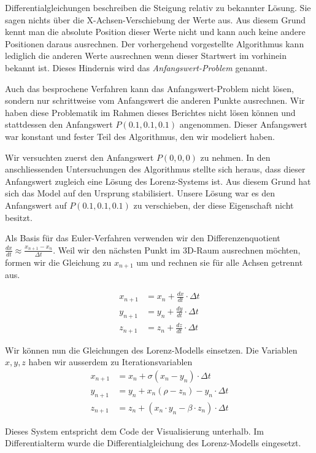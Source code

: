 Differentialgleichungen beschreiben die Steigung relativ zu bekannter Lösung. Sie sagen nichts über die X-Achsen-Verschiebung der Werte aus. Aus diesem Grund kennt man die absolute Position dieser Werte nicht und kann auch keine andere Positionen daraus ausrechnen. Der vorhergehend vorgestellte Algorithmus kann lediglich die anderen Werte ausrechnen wenn dieser Startwert im vorhinein bekannt ist. Dieses Hindernis wird das \textit{Anfangswert-Problem} genannt.

Auch das besprochene Verfahren kann das Anfangswert-Problem nicht lösen, sondern nur schrittweise vom Anfangswert die anderen Punkte ausrechnen. Wir haben diese Problematik im Rahmen dieses Berichtes nicht lösen können und stattdessen den Anfangswert $ P(0.1, 0.1, 0.1) $ angenommen. Dieser Anfangswert war konstant und fester Teil des Algorithmus, den wir modeliert haben.

Wir versuchten zuerst den Anfangswert $ P(0, 0, 0) $ zu nehmen. In den anschliessenden Untersuchungen des Algorithmus stellte sich heraus, dass dieser Anfangswert zugleich eine Lösung des Lorenz-Systems ist. Aus diesem Grund hat sich das Model auf den Ursprung stabilisiert. Unsere Lösung war es den Anfangswert auf $ P(0.1, 0.1, 0.1) $ zu verschieben, der diese Eigenschaft nicht besitzt.

Als Basis für das Euler-Verfahren verwenden wir den Differenzenquotient $ \frac{dx}{dt} \approx \frac{x_{n + 1} - x_n}{\Delta t} $. \cite{euler1768} Weil wir den nächsten Punkt im 3D-Raum ausrechnen möchten, formen wir die Gleichung zu $ x_{n + 1} $  um und rechnen sie für alle Achsen getrennt aus.

\begin{align}
    x_{n + 1} &= x_n + \frac{dx}{dt} \cdot \Delta t\\
    y_{n + 1} &= y_n + \frac{dy}{dt} \cdot \Delta t\\
    z_{n + 1} &= z_n + \frac{dz}{dt} \cdot \Delta t
\end{align}

Wir können nun die Gleichungen des Lorenz-Modells einsetzen. Die Variablen $ x, y, z $ haben wir ausserdem zu Iterationsvariablen 
\begin{align}
    x_{n + 1} &= x_n + \sigma(x_n - y_n) \cdot \Delta t\\
    y_{n + 1} &= y_n + x_n(\rho - z_n) - y_n \cdot \Delta t\\
    z_{n + 1} &= z_n + (x_n \cdot y_n - \beta \cdot z_n) \cdot \Delta t
\end{align}

Dieses System entspricht dem Code der Visualisierung unterhalb. Im Differentialterm wurde die Differentialgleichung des Lorenz-Modells eingesetzt.
